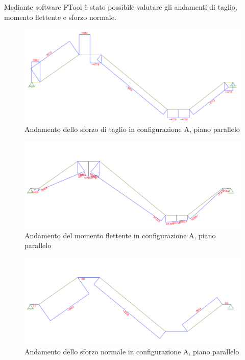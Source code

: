 Mediante software FTool è stato possibile valutare gli andamenti di taglio, momento flettente e sforzo normale. 
\newpage
\begin{figure}[h]
    \centering
    \includegraphics[scale=0.5]{Immagini/AndamentoTaglioAAlberoPar.png}
    \caption{Andamento dello sforzo di taglio in configurazione A, piano parallelo}
    \label{fig:AndamentoTalioAAlberoPar}
\end{figure}
\begin{figure}[h]
    \centering
    \includegraphics[scale=0.5]{Immagini/AndamentoMomentoAAlberoPar.png}
    \caption{Andamento del momento flettente in configurazione A, piano parallelo}
    \label{fig:AndamentoMomentoAAlberoPar}
\end{figure}
\begin{figure}[h!]
    \centering
    \includegraphics[scale=0.5]{Immagini/AndamentoNormaleAAlberoPar.png}
    \caption{Andamento dello sforzo normale in configurazione A, piano parallelo}
    \label{fig:AndamentoNormaleAAlberoPar}
\end{figure}
\newpage
